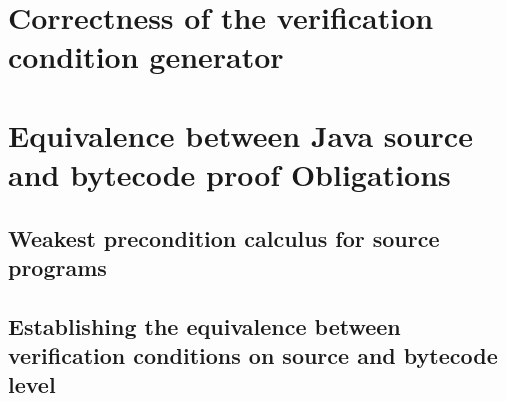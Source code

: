 \documentclass[book,10pt]{book}
\begin{document}
\chapter{Correctness of the verification condition generator}\label{proofGeneral}
  
  
  
  



\chapter{Equivalence between Java source and bytecode proof Obligations}\label{pogEquiv}
  
  
  
   
	 
  
%   
%   
   
  

  \section{Weakest precondition calculus for source programs}\label{pog:wpSrcGeneral}
     
    	  
    
    



 
 \section{Establishing the equivalence between verification conditions on source and bytecode level} \label{pog:wpBcGeneral}
   
\end{document}
